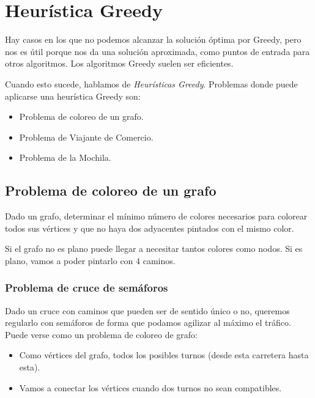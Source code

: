 
\section{Heurística Greedy}
Hay casos en los que no podemos alcanzar la solución óptima por Greedy, pero nos es útil porque nos da una solución aproximada, como puntos de entrada para otros algoritmos. Los algoritmos Greedy suelen ser eficientes.

Cuando esto sucede, hablamos de \emph{Heurísticas Greedy}. Problemas donde puede aplicarse una heurística Greedy son:
\begin{itemize}
    \item Problema de coloreo de un grafo.
    \item Problema de Viajante de Comercio.
    \item Problema de la Mochila.
\end{itemize}

\subsection{Problema de coloreo de un grafo}
Dado un grafo, determinar el mínimo número de colores necesarios para colorear todos sus vértices y que no haya dos adyacentes pintados con el mismo color.

Si el grafo no es plano puede llegar a necesitar tantos colores como nodos. Si es plano, vamos a poder pintarlo con 4 caminos.

\subsubsection{Problema de cruce de semáforos}
Dado un cruce con caminos que pueden ser de sentido único o no, queremos regularlo con semáforos de forma que podamos agilizar al máximo el tráfico. Puede verse como un problema de coloreo de grafo:
\begin{itemize}
    \item Como vértices del grafo, todos los posibles turnos (desde esta carretera hasta esta).
    \item Vamos a conectar los vértices cuando dos turnos no sean compatibles.
\end{itemize}

